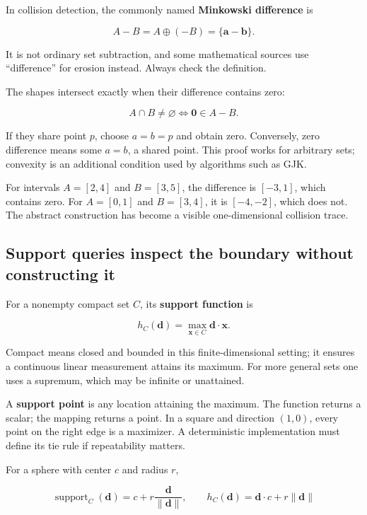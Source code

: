 In collision detection, the commonly named \textbf{Minkowski difference} is

\[
A-B=A\oplus(-B)=\{\mathbf a-\mathbf b\}.
\]

It is not ordinary set subtraction, and some mathematical sources use ``difference'' for erosion instead. Always check the definition.

The shapes intersect exactly when their difference contains zero:

\[
A\cap B\ne\varnothing\iff\mathbf0\in A-B.
\]

If they share point \(p\), choose \(a=b=p\) and obtain zero. Conversely, zero difference means some \(a=b\), a shared point. This proof works for arbitrary sets; convexity is an additional condition used by algorithms such as GJK.

For intervals \(A=[2,4]\) and \(B=[3,5]\), the difference is \([-3,1]\), which contains zero. For \(A=[0,1]\) and \(B=[3,4]\), it is \([-4,-2]\), which does not. The abstract construction has become a visible one-dimensional collision trace.

\subsection{Support queries inspect the boundary without constructing it}\label{01-foundations-i-ch018-support-queries-inspect-the-boundary-without-constructing-it}

\hypertarget{01-foundations-i-ch018-support-queries-inspect-the-boundary-without-constructing-it}{}

For a nonempty compact set \(C\), its \textbf{support function} is

\[
h_C(\mathbf d)=\max_{\mathbf x\in C}\mathbf d\cdot\mathbf x.
\]

Compact means closed and bounded in this finite-dimensional setting; it ensures a continuous linear measurement attains its maximum. For more general sets one uses a supremum, which may be infinite or unattained.

A \textbf{support point} is any location attaining the maximum. The function returns a scalar; the mapping returns a point. In a square and direction \((1,0)\), every point on the right edge is a maximizer. A deterministic implementation must define its tie rule if repeatability matters.

For a sphere with center \(c\) and radius \(r\),

\[
\operatorname{support}_C(\mathbf d)=c+r\frac{\mathbf d}{\|\mathbf d\|},
\qquad h_C(\mathbf d)=\mathbf d\cdot c+r\|\mathbf d\|
\]

